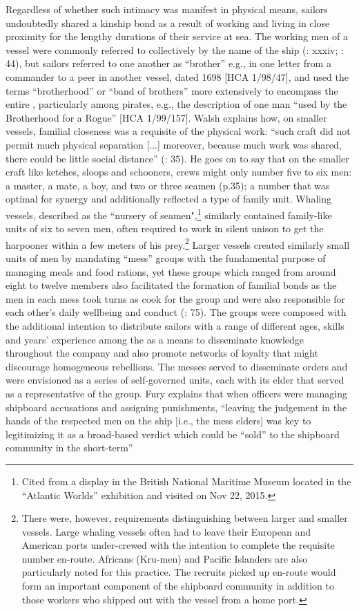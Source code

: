 Regardless of whether such intimacy was manifest in physical means, sailors undoubtedly shared a kinship bond as a result of working and living in close proximity for the lengthy durations of their service at sea. The working men of a vessel were commonly referred to collectively by the name of the ship (\citealt{AdkinsAdkins2008}: xxxiv; \citealt{Palmer1986}: 44), but sailors referred to one another as “brother” e.g., in one letter from a commander to a peer in another vessel, dated 1698 [HCA 1/98/47], and used the terms “brotherhood” or “band of brothers” more extensively to encompass the entire , particularly among pirates, e.g., the description of one man “used by the Brotherhood for a Rogue” [HCA 1/99/157]. Walsh explains how, on smaller vessels, familial closeness was a requisite of the physical work: “such craft did not permit much physical separation [...] moreover, because much work was shared, there could be little social distance” (\citealt{Walsh1994}: 35). He goes on to say that on the smaller craft like ketches, sloops and schooners, crews might only number five to six men: a master, a mate, a boy, and two or three seamen (p.35); a number that was optimal for synergy and additionally reflected a type of family unit. Whaling vessels, described as the “nursery of seamen",\footnote{Cited from a display in the British National Maritime Museum located in the “Atlantic Worlds” exhibition and visited on Nov 22, 2015.} similarly contained family-like units of six to seven men, often required to work in silent unison to get the harpooner within a few meters of his prey.\footnote{There were, however,  requirements distinguishing between larger and smaller vessels. Large whaling vessels often had to leave their European and American ports under-crewed with the intention to complete the requisite  number en-route. Africans (Kru-men) and Pacific Islanders are also particularly noted for this practice. The recruits picked up en-route would form an important component of the shipboard community in addition to those workers who shipped out with the vessel from a home port.}  Larger vessels created similarly small units of men by mandating “mess” groups with the fundamental purpose of managing meals and food rations, yet these groups which ranged from around eight to twelve members also facilitated the formation of familial bonds as the men in each mess took turns as cook for the group and were also responsible for each other’s daily wellbeing and conduct (\citealt{AdkinsAdkins2008}: 75). The groups were composed with the additional intention to distribute sailors with a range of different ages, skills and years’ experience among the  as a means to disseminate knowledge throughout the company and also promote networks of loyalty that might discourage homogeneous rebellions. The messes served to disseminate orders and were envisioned as a series of self-governed units, each with its elder that served as a representative of the group. Fury explains that when officers were managing shipboard accusations and assigning punishments, “leaving the judgement in the hands of the respected men on the ship [i.e., the mess elders] was key to legitimizing it as a broad-based verdict which could be “sold” to the shipboard community in the short-term” 